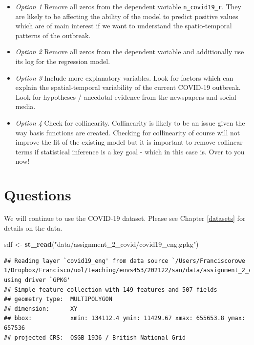 \documentclass[
]{book}
\newenvironment{Shaded}{\begin{snugshade}}{\end{snugshade}}
\newcommand{\KeywordTok}[1]{\textcolor[rgb]{0.13,0.29,0.53}{\textbf{#1}}}
\newcommand{\NormalTok}[1]{#1}
\newcommand{\StringTok}[1]{\textcolor[rgb]{0.31,0.60,0.02}{#1}}
\providecommand{\tightlist}{%
  \setlength{\itemsep}{0pt}\setlength{\parskip}{0pt}}
\begin{document}
\begin{itemize}
\tightlist
\item
  \emph{Option 1} Remove all zeros from the dependent variable \texttt{n\_covid19\_r}. They are likely to be affecting the ability of the model to predict positive values which are of main interest if we want to understand the spatio-temporal patterns of the outbreak.
\item
  \emph{Option 2} Remove all zeros from the dependent variable and additionally use its log for the regression model.
\item
  \emph{Option 3} Include more explanatory variables. Look for factors which can explain the spatial-temporal variability of the current COVID-19 outbreak. Look for hypotheses / anecdotal evidence from the newspapers and social media.
\item
  \emph{Option 4} Check for collinearity. Collinearity is likely to be an issue given the way basis functions are created. Checking for collinearity of course will not improve the fit of the existing model but it is important to remove collinear terms if statistical inference is a key goal - which in this case is. Over to you now!
\end{itemize}

\hypertarget{questions-6}{%
\section{Questions}\label{questions-6}}

We will continue to use the COVID-19 dataset. Please see Chapter \ref{datasets} for details on the data.

\begin{Shaded}
\begin{Highlighting}[]
\NormalTok{sdf <-}\StringTok{ }\KeywordTok{st_read}\NormalTok{(}\StringTok{"data/assignment_2_covid/covid19_eng.gpkg"}\NormalTok{)}
\end{Highlighting}
\end{Shaded}

\begin{verbatim}
## Reading layer `covid19_eng' from data source `/Users/Franciscorowe 1/Dropbox/Francisco/uol/teaching/envs453/202122/san/data/assignment_2_covid/covid19_eng.gpkg' using driver `GPKG'
## Simple feature collection with 149 features and 507 fields
## geometry type:  MULTIPOLYGON
## dimension:      XY
## bbox:           xmin: 134112.4 ymin: 11429.67 xmax: 655653.8 ymax: 657536
## projected CRS:  OSGB 1936 / British National Grid
\end{verbatim}
\end{document}

